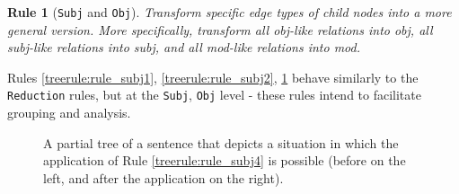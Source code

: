 \documentclass[11pt,a4paper,openright]{memoir}
\newtheorem{treerule}{Rule}
\begin{document}
\begin{treerule}[\texttt{Subj} and \texttt{Obj}]
\label{treerule:rule_subj3}
Transform specific edge types of child nodes into a more general version. More specifically, transform all \emph{obj}-like relations into \emph{obj}, all \emph{subj}-like relations into \emph{subj}, and all \emph{mod}-like relations into \emph{mod}.
\end{treerule}

Rules \ref{treerule:rule_subj1}, \ref{treerule:rule_subj2}, \ref{treerule:rule_subj3} behave similarly to the \texttt{Reduction} rules, but at the \texttt{Subj}, \texttt{Obj} level - these rules intend to facilitate grouping and analysis.

\begin{figure}[!htbp]
\centering

\begin{minipage}{.5\textwidth}
\centering
{}

\end{minipage}%
\begin{minipage}{.5\textwidth}
\centering
{}

\end{minipage}

\caption[A partial tree of a sentence that depicts a tree in which the application of Rule \ref{treerule:rule_subj4} is possible (before).]{A partial tree of a sentence that depicts a situation in which the application of Rule \ref{treerule:rule_subj4} is possible (before on the left, and after the application on the right).}
\label{fig:subj_obj_rule4_before_after}
\end{figure}
\end{document}
